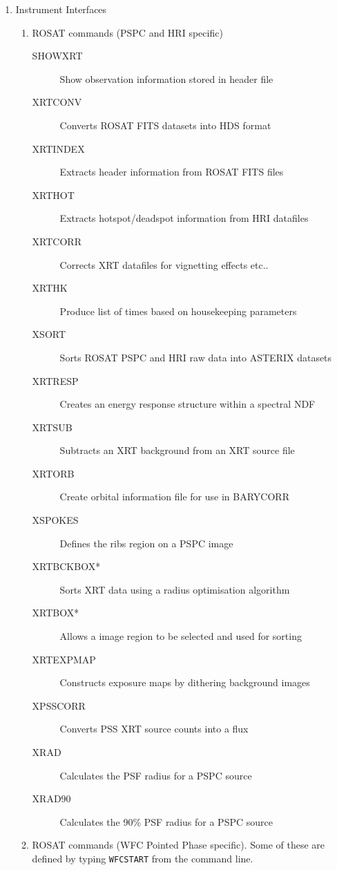 \documentclass{book}
\renewcommand{\_}{{\tt\char'137}}     %
\begin{document}
\begin{enumerate}
\item Instrument Interfaces

\begin{enumerate}
\item ROSAT commands (PSPC and HRI specific)

\begin{description}
\item[SHOWXRT]
Show observation information stored in header file
\item[XRTCONV]
Converts ROSAT FITS datasets into HDS format
\item[XRTINDEX]
Extracts header information from ROSAT FITS files
\item[XRTHOT]
Extracts hotspot/deadspot information from HRI datafiles
\item[XRTCORR]
Corrects XRT datafiles for vignetting effects etc..
\item[XRTHK]
Produce list of times based on housekeeping parameters
\item[XSORT]
Sorts ROSAT PSPC and HRI raw data into ASTERIX datasets
\item[XRTRESP]
Creates an energy response structure within a spectral NDF
\item[XRTSUB]
Subtracts an XRT background from an XRT source file
\item[XRTORB]
Create orbital information file for use in BARYCORR
\item[XSPOKES]
Defines the ribs region on a PSPC image
\item[XRTBCKBOX*]
Sorts XRT data using a radius optimisation algorithm
\item[XRTBOX*]
Allows a image region to be selected and used for sorting
\item[XRTEXPMAP]
Constructs exposure maps by dithering background images
\item[XPSSCORR]
Converts PSS XRT source counts into a flux
\item[XRAD]
Calculates the PSF radius for a PSPC source
\item[XRAD90]
Calculates the 90\% PSF radius for a PSPC source
\end{description}
\item ROSAT commands (WFC Pointed Phase specific). Some of these are
defined by typing {\tt WFCSTART} from the command line.


\end{enumerate}
\end{enumerate}
\end{document}
